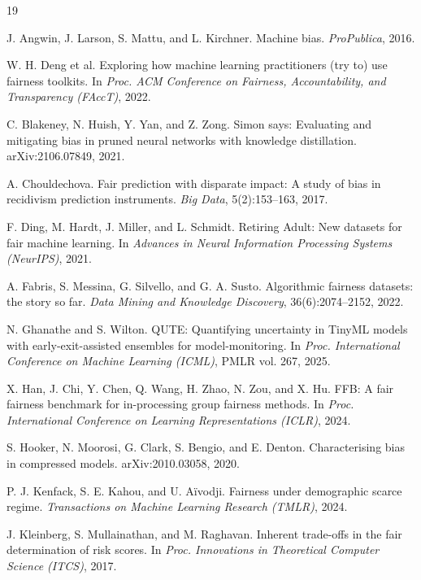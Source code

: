 \documentclass{article}
\begin{document}
\begin{thebibliography}{19}

J. Angwin, J. Larson, S. Mattu, and L. Kirchner.
\newblock Machine bias.
\newblock \emph{ProPublica}, 2016.

W. H. Deng et al.
\newblock Exploring how machine learning practitioners (try to) use fairness toolkits.
\newblock In \emph{Proc. ACM Conference on Fairness, Accountability, and Transparency (FAccT)}, 2022.

C. Blakeney, N. Huish, Y. Yan, and Z. Zong.
\newblock Simon says: Evaluating and mitigating bias in pruned neural networks with knowledge distillation.
\newblock arXiv:2106.07849, 2021.

A. Chouldechova.
\newblock Fair prediction with disparate impact: A study of bias in recidivism prediction instruments.
\newblock \emph{Big Data}, 5(2):153--163, 2017.

F. Ding, M. Hardt, J. Miller, and L. Schmidt.
\newblock Retiring Adult: New datasets for fair machine learning.
\newblock In \emph{Advances in Neural Information Processing Systems (NeurIPS)}, 2021.

A. Fabris, S. Messina, G. Silvello, and G. A. Susto.
\newblock Algorithmic fairness datasets: the story so far.
\newblock \emph{Data Mining and Knowledge Discovery}, 36(6):2074--2152, 2022.

N. Ghanathe and S. Wilton.
\newblock QUTE: Quantifying uncertainty in TinyML models with early-exit-assisted ensembles for model-monitoring.
\newblock In \emph{Proc. International Conference on Machine Learning (ICML)}, PMLR vol. 267, 2025.

X. Han, J. Chi, Y. Chen, Q. Wang, H. Zhao, N. Zou, and X. Hu.
\newblock FFB: A fair fairness benchmark for in-processing group fairness methods.
\newblock In \emph{Proc. International Conference on Learning Representations (ICLR)}, 2024.

S. Hooker, N. Moorosi, G. Clark, S. Bengio, and E. Denton.
\newblock Characterising bias in compressed models.
\newblock arXiv:2010.03058, 2020.

P. J. Kenfack, S. E. Kahou, and U. A\"{i}vodji.
\newblock Fairness under demographic scarce regime.
\newblock \emph{Transactions on Machine Learning Research (TMLR)}, 2024.

J. Kleinberg, S. Mullainathan, and M. Raghavan.
\newblock Inherent trade-offs in the fair determination of risk scores.
\newblock In \emph{Proc. Innovations in Theoretical Computer Science (ITCS)}, 2017.


\end{thebibliography}
\end{document}
